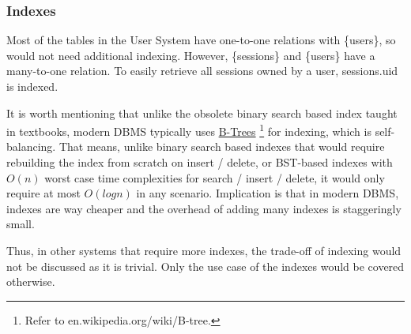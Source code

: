 \documentclass[12pt]{report}
\newcommand{\n}{\par}
\begin{document}
\subsubsection{Indexes} \label{data-layer.design.user-system.indexes}
Most of the tables in the User System have one-to-one relations with \{users\},
so would not need additional indexing.
However, \{sessions\} and \{users\} have a many-to-one relation.
To easily retrieve all sessions owned by a user, sessions.uid is indexed.\n
It is worth mentioning that unlike the obsolete binary search based index taught in textbooks, modern DBMS typically uses
\href{https://en.wikipedia.org/wiki/B-tree}{B-Trees}
\footnote{Refer to en.wikipedia.org/wiki/B-tree.}
for indexing, which is self-balancing.
That means, unlike binary search based indexes that would require rebuilding the index from scratch on insert / delete,
or BST-based indexes with $O(n)$ worst case time complexities for search / insert / delete,
it would only require at most $O(logn)$ in any scenario.
Implication is that in modern DBMS, indexes are way cheaper and the overhead of adding many indexes is staggeringly small.\n
Thus, in other systems that require more indexes, the trade-off of indexing would not be discussed as it is trivial.
Only the use case of the indexes would be covered otherwise.
\end{document}
